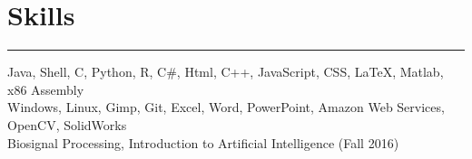 \documentclass[letterpaper]{deedy-resume} %
\newcommand{\colorrule}[1]{%
\begingroup\color{#1}\hrule\endgroup%
}%
\begin{document}
\section{Skills}
\normalfont
\colorrule{black}
\vspace{2 mm}
Java, Shell, C, Python, R, C\#, Html, C++, JavaScript, CSS, LaTeX, Matlab, x86 Assembly\\
Windows, Linux, Gimp, Git, Excel, Word, PowerPoint, Amazon Web Services, OpenCV, SolidWorks\\ 
Biosignal Processing, Introduction to Artificial Intelligence (Fall 2016)\\

\sectionspace %

\end{document}
